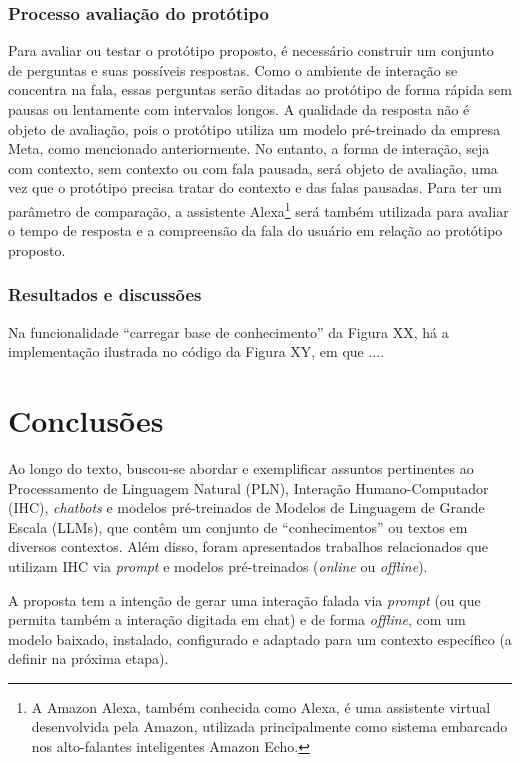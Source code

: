 \documentclass[10pt, conference, compsocconf]{IEEEtran}
\begin{document}
\FloatBarrier


\subsubsection{Processo avaliação do protótipo}

Para avaliar ou testar o protótipo proposto, é necessário construir um conjunto de perguntas e suas possíveis respostas. Como o ambiente de interação se concentra na fala, essas perguntas serão ditadas ao protótipo de forma rápida sem pausas ou lentamente com intervalos longos. A qualidade da resposta não é objeto de avaliação, pois o protótipo utiliza um modelo pré-treinado da empresa Meta, como mencionado anteriormente. No entanto, a forma de interação, seja com contexto, sem contexto ou com fala pausada, será objeto de avaliação, uma vez que o protótipo precisa tratar do contexto e das falas pausadas. Para ter um parâmetro de comparação, a assistente Alexa\footnote{A Amazon Alexa, também conhecida como Alexa, é uma assistente virtual desenvolvida pela Amazon, utilizada principalmente como sistema embarcado nos alto-falantes inteligentes Amazon Echo.} será também utilizada para avaliar o tempo de resposta e a compreensão da fala do usuário em relação ao protótipo proposto.

\subsubsection{Resultados e discussões}

Na funcionalidade ``carregar base de conhecimento'' da Figura XX, há a implementação ilustrada no código da Figura XY, em que ....




\section{Conclusões}

Ao longo do texto, buscou-se abordar e exemplificar assuntos pertinentes ao Processamento de Linguagem Natural (PLN), Interação Humano-Computador (IHC), \textit{chatbots} e modelos pré-treinados de Modelos de Linguagem de Grande Escala (LLMs), que contêm um conjunto de ``conhecimentos'' ou textos em diversos contextos. Além disso, foram apresentados trabalhos relacionados que utilizam IHC via \textit{prompt} e modelos pré-treinados (\textit{online} ou \textit{offline}).

A proposta tem a intenção de gerar uma interação falada via \textit{prompt} (ou que permita também a interação digitada em chat) e de forma \textit{offline}, com um modelo baixado, instalado, configurado e adaptado para um contexto específico (a definir na próxima etapa).
\end{document}
